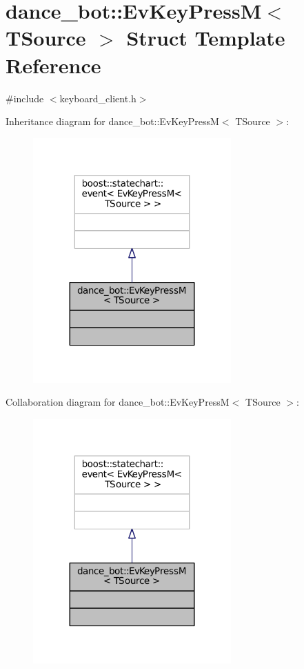 \hypertarget{structdance__bot_1_1EvKeyPressM}{}\section{dance\+\_\+bot\+:\+:Ev\+Key\+PressM$<$ T\+Source $>$ Struct Template Reference}
\label{structdance__bot_1_1EvKeyPressM}


{\ttfamily \#include $<$keyboard\+\_\+client.\+h$>$}



Inheritance diagram for dance\+\_\+bot\+:\+:Ev\+Key\+PressM$<$ T\+Source $>$\+:
\nopagebreak
\begin{figure}[H]
\begin{center}
\leavevmode
\includegraphics[width=215pt]{structdance__bot_1_1EvKeyPressM__inherit__graph}
\end{center}
\end{figure}


Collaboration diagram for dance\+\_\+bot\+:\+:Ev\+Key\+PressM$<$ T\+Source $>$\+:
\nopagebreak
\begin{figure}[H]
\begin{center}
\leavevmode
\includegraphics[width=215pt]{structdance__bot_1_1EvKeyPressM__coll__graph}
\end{center}
\end{figure}


